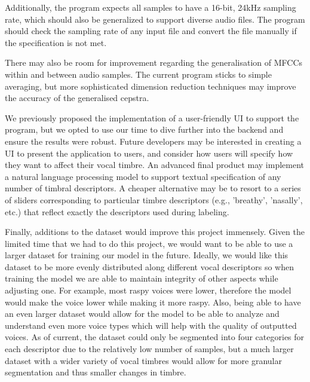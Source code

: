 \documentclass{article}
\begin{document}
Additionally, the program expects all samples to have a 16-bit, 24kHz sampling rate, which should also be generalized to support diverse audio files. The program should check the sampling rate of any input file and convert the file manually if the specification is not met.

There may also be room for improvement regarding the generalisation of MFCCs within and between audio samples. The current program sticks to simple averaging, but more sophisticated dimension reduction techniques may improve the accuracy of the generalised cepstra.

We previously proposed the implementation of a user-friendly UI to support the program, but we opted to use our time to dive further into the backend and ensure the results were robust. Future developers may be interested in creating a UI to present the application to users, and consider how users will specify how they want to affect their vocal timbre. An advanced final product may implement a natural language processing model to support textual specification of any number of timbral descriptors. A cheaper alternative may be to resort to a series of sliders corresponding to particular timbre descriptors (e.g., 'breathy', 'nasally', etc.) that reflect exactly the descriptors used during labeling.

Finally, additions to the dataset would improve this project immensely. Given the limited time that we had to do this project, we would want to be able to use a larger dataset for training our model in the future. Ideally, we would like this dataset to be more evenly distributed along different vocal descriptors so when training the model we are able to maintain integrity of other aspects while adjusting one. For example, most raspy voices were lower, therefore the model would make the voice lower while making it more raspy. Also, being able to have an even larger dataset would allow for the model to be able to analyze and understand even more voice types which will help with the quality of outputted voices. As of current, the dataset could only be segmented into four categories for each descriptor due to the relatively low number of samples, but a much larger dataset with a wider variety of vocal timbres would allow for more granular segmentation and thus smaller changes in timbre.
\end{document}
